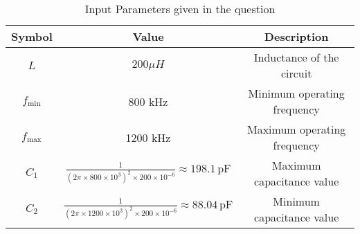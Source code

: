 \documentclass[12pt]{article}
\begin{document}
\begin{table}[h]
  \centering
  \caption{Input Parameters given in the question}
  \label{tab:parameters}
  \begin{tabular}{|c|c|c|}
    \hline
    \textbf{Symbol} & \textbf{Value} & \textbf{Description} \\
    \hline
    \(L\) & \(200 \mu H\) & Inductance of the circuit \\
    \(f_{\text{min}}\) & 800 kHz & Minimum operating frequency \\
    \(f_{\text{max}}\) & 1200 kHz & Maximum operating frequency \\
    \(C_1\) &  \(\frac{1}{(2\pi \times 800 \times 10^3)^2 \times 200 \times 10^{-6}} \approx 198.1 \, \mathrm{pF}\) & Maximum capacitance value \\
    \(C_2\) & \(\frac{1}{(2\pi \times 1200 \times 10^3)^2 \times 200 \times 10^{-6}} \approx 88.04 \, \mathrm{pF}\) & Minimum capacitance value \\
    \hline
  \end{tabular}
\end{table}
\end{document}
